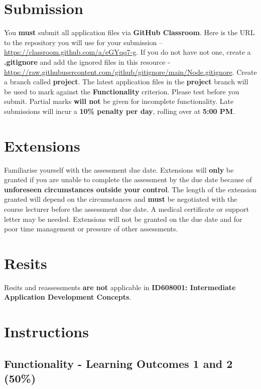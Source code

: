 \documentclass{article}
\begin{document}
\section*{Submission}
You \textbf{must} submit all application files via \textbf{GitHub Classroom}. Here is the URL to the repository you will use for your submission – \href{https://classroom.github.com/a/eGYqq7-g}{https://classroom.github.com/a/eGYqq7-g}. If you do not have not one, create a \textbf{.gitignore} and add the ignored files in this resource - \href{https://raw.githubusercontent.com/github/gitignore/main/Node.gitignore}{https://raw.githubusercontent.com/github/gitignore/main/Node.gitignore}. Create a branch called \textbf{project}. The latest application files in the \textbf{project} branch will be used to mark against the \textbf{Functionality} criterion. Please test before you submit. Partial marks \textbf{will not} be given for incomplete functionality. Late submissions will incur a \textbf{10\% penalty per day}, rolling over at \textbf{5:00 PM}.\\

\section*{Extensions}
Familiarise yourself with the assessment due date. Extensions will \textbf{only} be granted if you are unable to complete the assessment by the due date because of \textbf{unforeseen circumstances outside your control}. The length of the extension granted will depend on the circumstances and \textbf{must} be negotiated with the course lecturer before the assessment due date. A medical certificate or support letter may be needed. Extensions will not be granted on the due date and for poor time management or pressure of other assessments.

\section*{Resits}
Resits and reassessments \textbf{are not} applicable in \textbf{ID608001: Intermediate Application Development Concepts}.

\section*{Instructions}

\subsection*{Functionality - Learning Outcomes 1 and 2 (50\%)}
\end{document}
